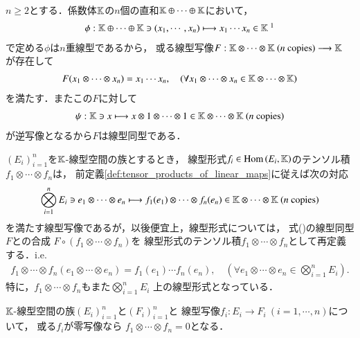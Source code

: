 	$n \geq 2$とする．係数体$\mathbb{K}$の$n$個の直和$\mathbb{K} \oplus \cdots \oplus \mathbb{K}$において，
	\begin{align}
		\phi:\K \oplus \cdots \oplus \K \ni (x_1,\cdots,x_n)
		\longmapsto x_1 \cdots x_n \in \K\ \footnotemark
	\end{align}
	で定める$\phi$は$n$重線型であるから，
	或る線型写像$F:\K \otimes \cdots \otimes \K\ \mbox{($n$ copies)} \longrightarrow \K$
	が存在して
	\begin{align}
		F(x_1 \otimes \cdots \otimes x_n) = x_1 \cdots x_n,
		\quad (\forall x_1 \otimes \cdots \otimes x_n \in \mathbb{K} \otimes \cdots \otimes \mathbb{K})
		\label{eq:tensor_products_of_linear_forms_1}
	\end{align}
	を満たす．またこの$F$に対して
	\begin{align}
		\psi:\K \ni x \longmapsto x \otimes 1 \otimes \cdots \otimes 1 
		\in \K \otimes \cdots \otimes \K\ 
		\mbox{($n$ copies)}
	\end{align}
	が逆写像となるから$F$は線型同型である．
	
	\begin{screen}
		\begin{dfn}[線型形式のテンソル積]
			$(E_i)_{i=1}^n$を$\mathbb{K}$-線型空間の族とするとき，
			線型形式$f_i \in \mathrm{Hom} \left(E_i,\mathbb{K}\right)$のテンソル積
			$f_1 \otimes \cdots \otimes f_n$は，
			前定義\ref{def:tensor_products_of_linear_maps}に従えば次の対応
			\begin{align}
				\bigotimes_{i=1}^n E_i \ni e_1 \otimes \cdots \otimes e_n
				\longmapsto f_1(e_1) \otimes \cdots \otimes f_n(e_n)
				\in \mathbb{K} \otimes \cdots \otimes \mathbb{K}\ (\mbox{$n$ copies})
			\end{align}
			を満たす線型写像であるが，以後便宜上，線型形式については，
			式()の線型同型$F$との合成
			$F \circ (f_1 \otimes \cdots \otimes f_n)$を
			線型形式のテンソル積$f_1 \otimes \cdots \otimes f_n$として再定義する．i.e.
			\begin{align}
				f_1 \otimes \cdots \otimes f_n(e_1 \otimes \cdots \otimes e_n)
				= f_1(e_1) \cdots f_n(e_n),
				\quad (\forall e_1 \otimes \cdots \otimes e_n \in \bigotimes_{i=1}^n E_i).
			\end{align}
			特に，$f_1 \otimes \cdots \otimes f_n$もまた$\bigotimes_{i=1}^n E_i$
			上の線型形式となっている．
		\end{dfn}
	\end{screen}
	
	\begin{screen}
		\begin{thm}[零写像のテンソル積は零写像]
		\label{thm:tensor_product_contains_zero_mapping_is_zero}
			$\mathbb{K}$-線型空間の族$(E_i)_{i=1}^n$と$(F_i)_{i=1}^n$と
			線型写像$f_i:E_i \longrightarrow F_i\ (i=1,\cdots,n)$について，
			或る$f_i$が零写像なら
			$f_1 \otimes \cdots \otimes f_n = 0$となる．
		\end{thm}
	\end{screen}
	
